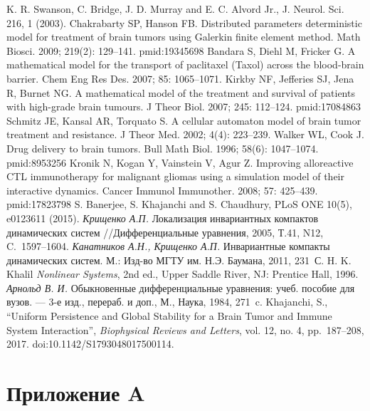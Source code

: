 \documentclass[14pt,a4paper]{extarticle}
\begin{document}
\begin{thebibliography}{\kern\bibindent}
		K. R. Swanson, C. Bridge, J. D. Murray and E. C. Alvord Jr., J. Neurol. Sci. 216, 1 (2003).
		Chakrabarty SP, Hanson FB. Distributed parameters deterministic model for treatment of brain tumors using Galerkin finite element method. Math Biosci. 2009; 219(2): 129–141. pmid:19345698
		Bandara S, Diehl M, Fricker G. A mathematical model for the transport of paclitaxel (Taxol) across the blood-brain barrier. Chem Eng Res Des. 2007; 85: 1065–1071.
		Kirkby NF, Jefferies SJ, Jena R, Burnet NG. A mathematical model of the treatment and survival of patients with high-grade brain tumours. J Theor Biol. 2007; 245: 112–124. pmid:17084863
		Schmitz JE, Kansal AR, Torquato S. A cellular automaton model of brain tumor treatment and resistance. J Theor Med. 2002; 4(4): 223–239.
		Walker WL, Cook J. Drug delivery to brain tumors. Bull Math Biol. 1996; 58(6): 1047–1074. pmid:8953256
		Kronik N, Kogan Y, Vainstein V, Agur Z. Improving alloreactive CTL immunotherapy for malignant gliomas using a simulation model of their interactive dynamics. Cancer Immunol Immunother. 2008; 57: 425–439. pmid:17823798
		S. Banerjee, S. Khajanchi and S. Chaudhury, PLoS ONE 10(5), e0123611 (2015). 
		\textit{Крищенко А.П.} Локализация инвариантных компактов динамических систем //Дифференциальные уравнения, 2005, Т.41, N12, C.~1597--1604.
		\textit{Канатников А.Н., Крищенко А.П.} Инвариантные компакты динамических систем. М.: Изд-во МГТУ им. Н.Э. Баумана, 2011, 231~С.
		H. K. Khalil \textit{Nonlinear Systems}, 2nd ed., Upper Saddle River, NJ: Prentice Hall, 1996.
		\textit{Арнольд В. И.} Обыкновенные дифференциальные уравнения: учеб. пособие для вузов. --- 3-е изд., перераб. и доп., М., Наука, 1984, 271~c.
		Khajanchi, S., “Uniform Persistence and Global Stability for a Brain Tumor and Immune System Interaction”, \textit{Biophysical Reviews and Letters}, vol. 12, no. 4, pp.~187–208, 2017. doi:10.1142/S1793048017500114.
	\end{thebibliography}
	
	\section*{Приложение A}


\newpage

\newpage

\end{document}
